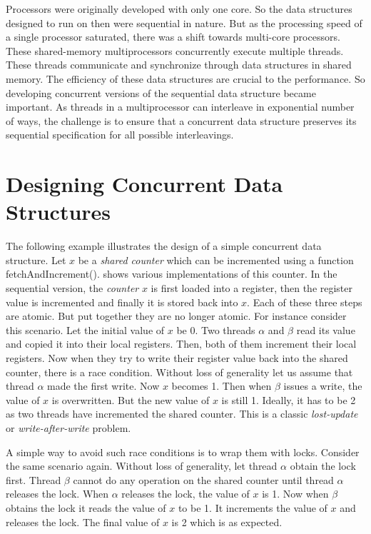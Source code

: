 Processors were originally developed with only one core. So the data structures designed to run on then were sequential in nature. But as the processing speed of a single processor saturated, there was a shift towards multi-core processors. These shared-memory multiprocessors concurrently execute multiple threads. These threads communicate and synchronize through data structures in shared memory. The efficiency of these data structures are crucial to the performance. So developing concurrent versions of the sequential data structure became important. As threads in a multiprocessor can interleave in exponential number of ways, the challenge is to ensure that a concurrent data structure preserves its sequential specification for all possible interleavings.

\section{Designing Concurrent Data Structures}
The following example illustrates the design of a simple concurrent data structure. Let $x$ be a \emph{shared counter} which can be incremented using a function fetchAndIncrement().  shows various implementations of this counter. In the sequential version, the \emph{counter} $x$ is first loaded into a register, then the register value is incremented and finally it is stored back into $x$. Each of these three steps are atomic. But put together they are no longer atomic. For instance consider this scenario. Let the initial value of $x$ be 0. Two threads $\alpha$ and $\beta$ read its value and copied it into their local registers. Then, both of them increment their local registers. Now when they try to write their register value back into the shared counter, there is a race condition. Without loss of generality let us assume that thread $\alpha$ made the first write. Now $x$ becomes 1. Then when $\beta$ issues a write, the value of $x$ is overwritten. But the new value of $x$ is still 1. Ideally, it has to be 2 as two threads have incremented the shared counter. This is a classic \emph{lost-update} or \emph{write-after-write} problem.



A simple way to avoid such race conditions is to wrap them with locks. Consider the same scenario again. Without loss of generality, let thread $\alpha$ obtain the lock first. Thread $\beta$ cannot do any operation on the shared counter until thread $\alpha$ releases the lock. When $\alpha$ releases the lock, the value of $x$ is 1. Now when $\beta$ obtains the lock it reads the value of $x$ to be 1. It increments the value of $x$ and releases the lock. The final value of $x$ is 2 which is as expected.

